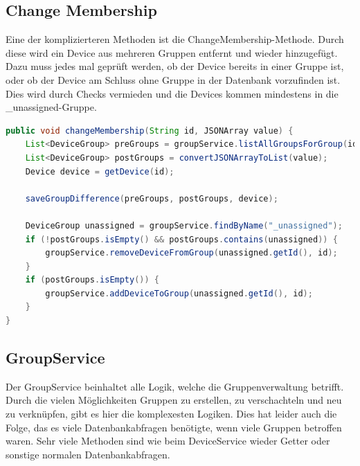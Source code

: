 \subsection{Change Membership}
Eine der komplizierteren Methoden ist die ChangeMembership-Methode. Durch diese wird ein Device aus mehreren Gruppen entfernt und wieder hinzugefügt. Dazu muss jedes mal geprüft werden, ob der Device bereits in einer Gruppe ist, oder ob der Device am Schluss ohne Gruppe in der Datenbank vorzufinden ist. Dies wird durch Checks vermieden und die Devices kommen mindestens in die \_unassigned-Gruppe.
\begin{lstlisting}[language=java]
public void changeMembership(String id, JSONArray value) {
	List<DeviceGroup> preGroups = groupService.listAllGroupsForGroup(id);
	List<DeviceGroup> postGroups = convertJSONArrayToList(value);
	Device device = getDevice(id);

	saveGroupDifference(preGroups, postGroups, device);

	DeviceGroup unassigned = groupService.findByName("_unassigned");
	if (!postGroups.isEmpty() && postGroups.contains(unassigned)) {
		groupService.removeDeviceFromGroup(unassigned.getId(), id);
	}
	if (postGroups.isEmpty()) {
		groupService.addDeviceToGroup(unassigned.getId(), id);
	}
}
\end{lstlisting}

\subsection{GroupService}
Der GroupService beinhaltet alle Logik, welche die Gruppenverwaltung betrifft. Durch die vielen Möglichkeiten Gruppen zu erstellen, zu verschachteln und neu zu verknüpfen, gibt es hier die komplexesten Logiken. Dies hat leider auch die Folge, das es viele Datenbankabfragen benötigte, wenn viele Gruppen betroffen waren. Sehr viele Methoden sind wie beim DeviceService wieder Getter oder sonstige normalen Datenbankabfragen.

